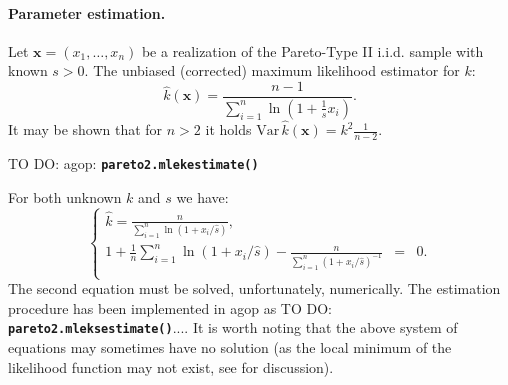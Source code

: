 \documentclass[11pt]{article}\usepackage{graphicx, color}
\newcommand{\hlfunctioncall}[1]{\textcolor[rgb]{0.501960784313725,0,0.329411764705882}{\textbf{#1}}}%
\newcommand{\package}[1]{\textsf{#1}\xspace}
\newcommand{\Rfunc}[1]{\texttt{\hlfunctioncall{#1}}}
\newcommand{\vect}[1]{{\mathbf{#1}}}
\theoremstyle{remark}
\theoremstyle{definition}
\begin{document}
\paragraph{Parameter estimation.}
Let $\vect{x}=(x_1,\dots,x_n)$ be a realization of the Pareto-Type II
i.i.d. sample with known $s>0$.
The unbiased (corrected) maximum likelihood estimator for $k$:
% 
\begin{equation*}
\widehat{k}(\vect{x})=\dfrac{n-1}{\sum_{i=1}^n \ln\left(1+\tfrac{1}{s} x_i\right)}.
\end{equation*}
It may be shown that for $n>2$ it holds
$\mathrm{Var}\,\widehat{k}(\vect{x})=k^2 \frac{1}{n-2}.$


TO DO: \package{agop}: 
\Rfunc{pareto2.mle\-kestimate()}

\bigskip
For both unknown $k$ and $s$ we have:
\begin{equation}\label{Eq:rownaniapochMLE}
\left\{
\begin{array}{lll}
\widehat{k} = \frac{n}{\sum_{i=1}^n \ln\left(1+x_i/\widehat{s}\right)}, \\
1+\frac{1}{n} \sum_{i=1}^n \ln\left(1+x_i/\widehat{s}\right) - \frac{n}{\sum_{i=1}^n \left(1+x_i/\widehat{s}\right)^{-1}}  &=& 0. \\
\end{array}\right.
\end{equation}
The second equation must be solved, unfortunately, numerically.
The estimation 
procedure has been implemented in \package{agop} as TO DO: \Rfunc{pareto2.mleksestimate()}....
It is worth noting that the above system of equations may sometimes
have no solution (as the local minimum of the likelihood function may not exist,
see \cite{CastilloDaoudi2009:mlegpd} for discussion).
\end{document}
